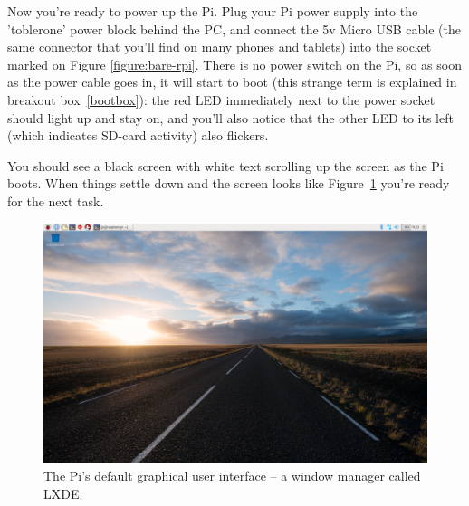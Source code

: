 Now you're ready to power up the Pi. Plug your Pi power supply into the 'toblerone' power block behind the PC, and connect the 5v Micro USB cable (the same connector that you'll find on many phones and tablets) into the socket marked  on Figure \ref{figure:bare-rpi}. There is no power switch on the Pi, so as soon as the power cable goes in, it will start to boot (this strange term is explained in breakout box~\ref{bootbox}): the red LED immediately next to the power socket should light up and stay on, and you'll also notice that the other LED to its left (which indicates SD-card activity) also flickers. 


You should see a black screen with white text scrolling up the screen as the Pi boots. When things settle down and the screen looks like Figure~\ref{figure:lxde-gui} you're ready for the next task. 

\begin{figure}
\centerline{\includegraphics[width=14cm]{images/pi3-LXDE-AY17.png}}
\caption{The Pi's default graphical user interface -- a window manager called LXDE.}\label{figure:lxde-gui}
\end{figure}

